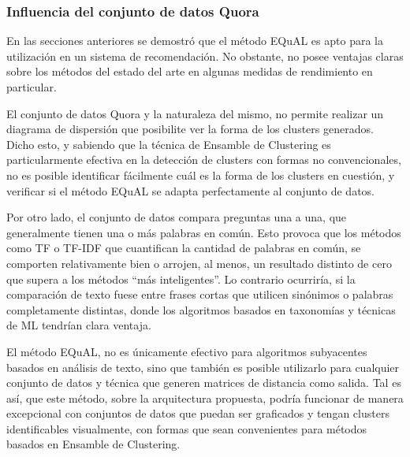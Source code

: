 \subsubsection{Influencia del conjunto de datos Quora}
En las secciones anteriores se demostró que el método EQuAL es apto para la utilización en un sistema de recomendación. No obstante, no posee ventajas claras sobre los métodos del estado del arte en algunas medidas de rendimiento en particular.

\bigskip El conjunto de datos Quora y la naturaleza del mismo, no permite realizar un diagrama de dispersión que posibilite ver la forma de los clusters generados. Dicho esto, y sabiendo que la técnica de Ensamble de Clustering es particularmente efectiva en la detección de clusters con formas no convencionales, no es posible identificar fácilmente cuál es la forma de los clusters en cuestión, y verificar si el método EQuAL se adapta perfectamente al conjunto de datos.

\bigskip Por otro lado, el conjunto de datos compara preguntas una a una, que generalmente tienen una o más palabras en común. Esto provoca que los métodos como TF o TF-IDF que cuantifican la cantidad de palabras en común, se comporten relativamente bien o arrojen, al menos, un resultado distinto de cero que supera a los métodos “más inteligentes”. Lo contrario ocurriría, si la comparación de texto fuese entre frases cortas que utilicen sinónimos o palabras completamente distintas, donde los algoritmos basados en taxonomías y técnicas de ML tendrían clara ventaja.

\bigskip El método EQuAL, no es únicamente efectivo para algoritmos subyacentes basados en análisis de texto, sino que también es posible utilizarlo para cualquier conjunto de datos y técnica que generen matrices de distancia como salida. Tal es así, que este método, sobre la arquitectura propuesta, podría funcionar de manera excepcional con conjuntos de datos que puedan ser graficados y tengan clusters identificables visualmente, con formas que sean convenientes para métodos basados en Ensamble de Clustering.

